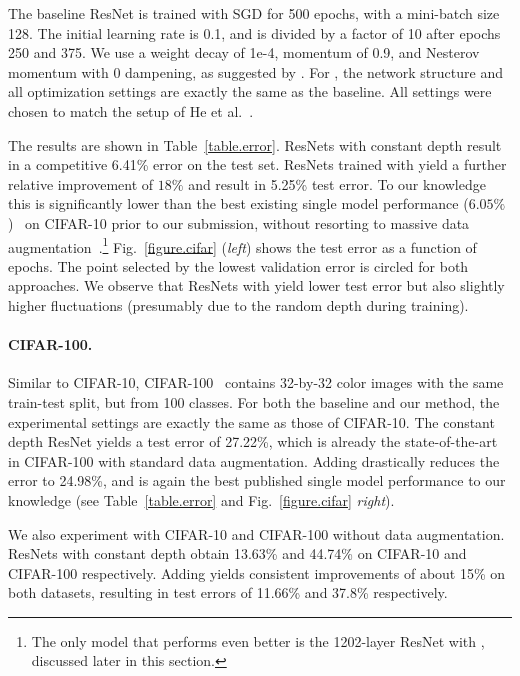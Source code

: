 \documentclass[runningheads]{llncs}
\begin{document}
The baseline ResNet is trained with SGD for 500 epochs, with a mini-batch size 128. The initial learning rate is 0.1, and is divided by a factor of 10 after epochs 250 and 375. We use a weight decay of 1e-4, momentum of 0.9, and Nesterov momentum \cite{sutskever2013importance} with 0 dampening, as suggested by \cite{blogpostresnet}. For \name{}, the network structure and all optimization settings are exactly the same as the baseline. All settings were chosen to match the setup of He et al.~\cite{he2015deep}.

The results are shown in Table~\ref{table.error}. ResNets with constant depth result in a competitive 6.41\% error on the test set. ResNets trained with \name{} yield a further relative improvement of $18\%$ and result in 5.25\% test error.
To our knowledge this is significantly lower than the best existing single model performance ($6.05\%$)~\cite{lee2015generalizing} on CIFAR-10 prior to our submission, without resorting to massive data augmentation~\cite{graham2014fractional,springenberg2014striving}.\footnote{The only model that performs even better is the 1202-layer ResNet with \name{}, discussed later in this section. }
Fig.~\ref{figure.cifar} (\textit{left}) shows the test error as a function of epochs. The point selected by the lowest validation error is circled for both approaches. We observe that ResNets with \name{} yield lower test error but also slightly higher fluctuations (presumably due to the random depth during training).

\paragraph{\textbf{CIFAR-100.}}
Similar to CIFAR-10, CIFAR-100~\cite{krizhevsky2009learning} contains 32-by-32 color images with the same train-test split, but from 100 classes. For both the baseline and our method, the experimental settings are exactly the same as those of CIFAR-10. The constant depth ResNet yields a test error of 27.22\%, which is already the state-of-the-art in CIFAR-100 with standard data augmentation. Adding \name{} drastically reduces the error to 24.98\%, and is again the best published single model performance to our knowledge (see Table~\ref{table.error} and Fig.~\ref{figure.cifar} \textit{right}).

We also experiment with CIFAR-10 and CIFAR-100 without data augmentation. ResNets with constant depth obtain 13.63\% and 44.74\% on CIFAR-10 and CIFAR-100 respectively. Adding \name{} yields consistent improvements of about 15\% on both datasets, resulting in test errors of 11.66\%  and 37.8\% respectively.
\end{document}
